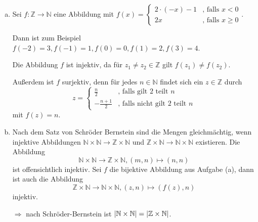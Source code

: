 \documentclass{scrreprt}
\begin{document}
\begin{enumerate}[(a)]
\item Sei $f \colon \mathbb{Z} \to \mathbb{N}$ eine Abbildung mit
  $f(x) = \begin{cases}
    2 \cdot (-x) - 1 & \text{, falls } x < 0 \\
    2x & \text{, falls } x \geq 0
  \end{cases}$.

  Dann ist zum Beispiel $f(-2) = 3, f(-1) = 1, f(0) = 0, f(1) = 2, f(3) = 4$.

  Die Abbildung $f$ ist injektiv, da für $z_1 \ne z_2 \in \mathbb{Z}$ gilt
  $f(z_1) \ne f(z_2)$.

  Außerdem ist $f$ surjektiv, denn für jedes $n \in \mathbb{N}$ findet sich ein
  $z \in \mathbb{Z}$ durch
  \[
    z =  \begin{cases}
      \frac{n}{2} & \text{, falls gilt $2$ teilt $n$} \\
      -\frac{n + 1}{2} & \text{, falls nicht gilt $2$ teilt $n$}
    \end{cases}
  \]
  mit $f(z) = n$.

\item Nach dem Satz von Schröder Bernstein sind die Mengen gleichmächtig,
  wenn injektive Abbildungen
  $\mathbb{N} \times \mathbb{N} \to \mathbb{Z} \times \mathbb{N}$ und
  $\mathbb{Z} \times \mathbb{N} \to \mathbb{N} \times \mathbb{N}$ existieren.
  Die Abbildung
  \[
    \mathbb{N} \times \mathbb{N} \to \mathbb{Z} \times \mathbb{N},
    (m, n) \mapsto (n, n)
  \]
  ist offensichtlich injektiv.
  Sei $f$ die bijektive Abbildung aus Aufgabe (a), dann ist auch die Abbildung
  \[
    \mathbb{Z} \times \mathbb{N} \to \mathbb{N} \times \mathbb{N},
    (z, n) \mapsto (f(z), n)
  \]
  injektiv.

  $\Rightarrow$ nach Schröder-Bernstein ist
  $\abs{\mathbb{N} \times \mathbb{N}} = \abs{\mathbb{Z} \times \mathbb{N}}$.
\end{enumerate}
\end{document}
